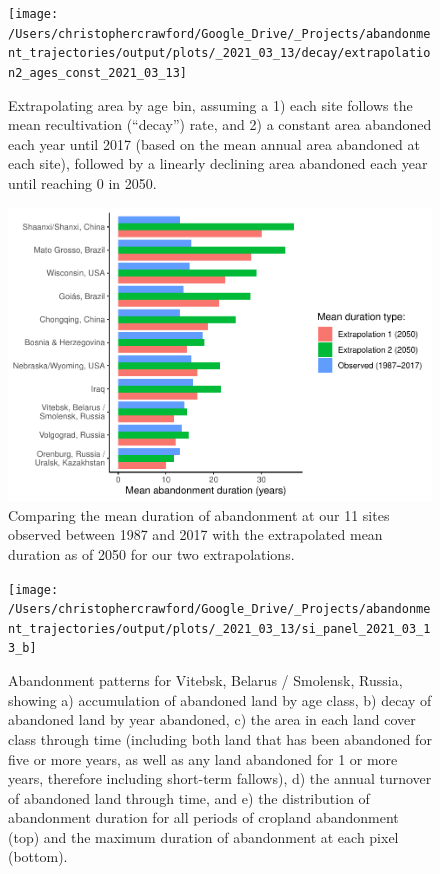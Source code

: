 \documentclass[
]{article}
\begin{document}
\begin{figure}
\texttt{[image: /Users/christophercrawford/Google\_Drive/\_Projects/abandonment\_trajectories/output/plots/\_2021\_03\_13/decay/extrapolation2\_ages\_const\_2021\_03\_13]} \caption{Extrapolating area by age bin, assuming a 1) each site follows the mean recultivation (``decay'') rate, and 2) a constant area abandoned each year until 2017 (based on the mean annual area abandoned at each site), followed by a linearly declining area abandoned each year until reaching 0 in 2050.}\label{fig:extrapolation2-area-by-age}
\end{figure}



\begin{figure}
\includegraphics[width=1\textwidth]{Crawford_abandonment_SI_files/figure-latex/mean-duration-2050-1} \caption{Comparing the mean duration of abandonment at our 11 sites observed between 1987 and 2017 with the extrapolated mean duration as of 2050 for our two extrapolations.}\label{fig:mean-duration-2050}
\end{figure}














\begin{figure}
\texttt{[image: /Users/christophercrawford/Google\_Drive/\_Projects/abandonment\_trajectories/output/plots/\_2021\_03\_13/si\_panel\_2021\_03\_13\_b]} \caption{Abandonment patterns for Vitebsk, Belarus / Smolensk, Russia, showing a) accumulation of abandoned land by age class, b) decay of abandoned land by year abandoned, c) the area in each land cover class through time (including both land that has been abandoned for five or more years, as well as any land abandoned for 1 or more years, therefore including short-term fallows), d) the annual turnover of abandoned land through time, and e) the distribution of abandonment duration for all periods of cropland abandonment (top) and the maximum duration of abandonment at each pixel (bottom).}\label{fig:panel-b}
\end{figure}
\end{document}
